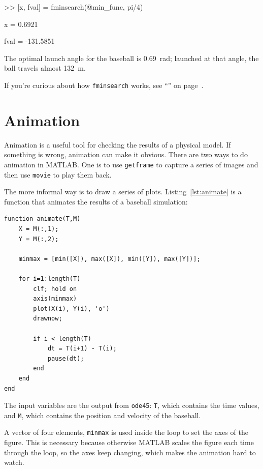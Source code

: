 \begin{code}
>> [x, fval] = fminsearch(@min_func, pi/4)

x = 0.6921

fval = -131.5851
\end{code}

The optimal launch angle for the baseball is \SI{0.69}{\radian}; launched at that angle, the ball travels almost \SI{132}{\meter}.

If you're curious about how \lstinline{fminsearch} works, see ``'' on page~\pageref{howfminsearch}.


\section{Animation}

Animation is a useful tool for checking the results of a physical model.
If something is wrong, animation can make it obvious.
There are two ways to do animation in MATLAB.
One is to use \lstinline{getframe} to capture a series of images and then use \lstinline{movie} to play them back.


The more informal way is to draw a series of plots.  Listing~\ref{lst:animate} is a function that animates the results of a baseball simulation:

\begin{lstlisting}[caption={A function that animates the results of a baseball simulation}, label={lst:animate}]
function animate(T,M)
    X = M(:,1);
    Y = M(:,2);

    minmax = [min([X]), max([X]), min([Y]), max([Y])];

    for i=1:length(T)
        clf; hold on
        axis(minmax)
        plot(X(i), Y(i), 'o')
        drawnow;

        if i < length(T)
            dt = T(i+1) - T(i);
            pause(dt);
        end
    end
end
\end{lstlisting}

The input variables are the output from \lstinline{ode45}: \lstinline{T}, which contains the time values, and \lstinline{M}, which contains the position and velocity of the baseball.


A vector of four elements, \lstinline{minmax} is used inside the loop to set the axes of the figure.
This is necessary because otherwise MATLAB scales the figure each time through the loop,
so the axes keep changing, which makes the animation hard to watch.

